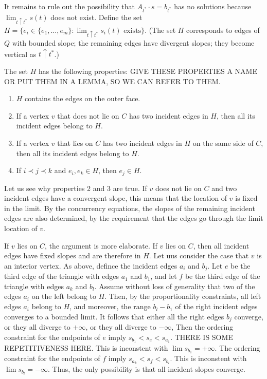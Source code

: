  It remains to rule out the possibility that
 $A_{t^*}\cdot s=b_{t^*}$ has no solutions because
   $\lim_{t\uparrow t^*} s(t)$ does not exist.  Define the set $H=\{e_i\in
   \{e_1,\ldots,e_m\}:\text{$\lim_{t\uparrow t^*} s_i(t)$ exists}\}$.
(The set $H$ corresponds to edges of $Q$
   with
   bounded slope; the remaining edges have divergent slopes; they
   become vertical as $t\uparrow t^*$.)
   \begin{proposition} \label{set-H}
The set   $H$ has the following
   properties:
GIVE THESE PROPERTIES A NAME OR PUT THEM IN A LEMMA, SO WE CAN REFER
TO THEM.
   \begin{enumerate}
    \item $H$ contains the edges
      on the outer face.
    \item \label{off-C}
If a vertex $v$ that does not lie on $C$ has two incident edges in
$H$,
then all its incident edges belong to $H$.
    \item \label{on-C}
If a vertex $v$ that lies on $C$ has two incident edges in
$H$ on the same side of $C$,
then all its incident edges belong to $H$.
    \item If $i \prec j \prec k$ and $e_i,e_k\in H$, 
      then $e_j\in H$.
   \end{enumerate}
   \end{proposition}
Let us see why properties 2 and 3 are true.
If $v$ does not lie on $C$ and two incident edges have a convergent
slope, this means that the location of $v$ is fixed in the limit.
By the concurrency equations, the slopes of the remaining incident
edges are also determined, by the requirement that the edges go through
the limit location of $v$.

If $v$ lies on $C$, the argument is more elaborate. If $v$ lies on
$C$, then all incident edges have fixed slopes and are therefore in
$H$.
Let uus consider the case that $v$ is an interior vertex.
As above, defince the incident edges $a_i$ and $b_j$.
Let $e$ be the third edge of the triangle with edges $a_1$ and $b_1$,
and let 
 $f$ be the third edge of the triangle with edges $a_k$ and $b_l$.
Assume without loss of generality that two of the edges $a_i$ on the
left belong to $H$. Then, by the proportionality constraints, all
left edges $a_i$ belong to $H$, and moreover, the range $b_l-b_1$ of
the right incident edges converges to a bounded limit.
It follows that either all the right edges $b_j$ converge, 
or they all diverge to $+\infty$,
or they all diverge to $-\infty$,
Then the ordering constraint for the endpoints of $e$ imply
\begin{math}
  s_{b_1}<s_e<s_{a_1}
\end{math}.
THERE IS SOME REPETITIVENESS HERE.
This is inconstent with $\lim s_{b_1}=+\infty$.
The ordering constraint for the endpoints of $f$ imply
\begin{math}
  s_{a_k}<s_f<s_{b_l}
\end{math}.
This is inconstent with $\lim s_{b_l}=-\infty$.
Thus, the only possibility is that all incident slopes converge.

